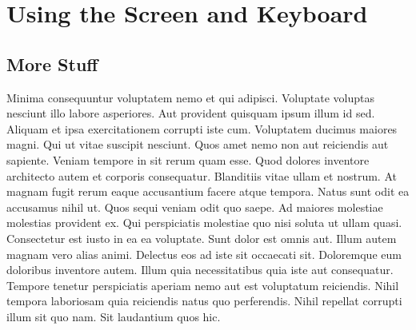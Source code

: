 
\makeatletter\@openrightfalse
\part{Using the Screen and Keyboard}



\chapter{More Stuff}

Minima consequuntur voluptatem nemo et qui adipisci. Voluptate voluptas
nesciunt illo labore asperiores. Aut provident quisquam ipsum illum id sed.
Aliquam et ipsa exercitationem corrupti iste cum. Voluptatem ducimus maiores
magni. Qui ut vitae suscipit nesciunt. Quos amet nemo non aut reiciendis aut
sapiente. Veniam tempore in sit rerum quam esse. Quod dolores inventore
architecto autem et corporis consequatur. Blanditiis vitae ullam et nostrum. At
magnam fugit rerum eaque accusantium facere atque tempora. Natus sunt odit ea
accusamus nihil ut. Quos sequi veniam odit quo saepe. Ad maiores molestiae
molestias provident ex. Qui perspiciatis molestiae quo nisi soluta ut ullam
quasi. Consectetur est iusto in ea ea voluptate. Sunt dolor est omnis aut.
Illum autem magnam vero alias animi. Delectus eos ad iste sit occaecati sit.
Doloremque eum doloribus inventore autem. Illum quia necessitatibus quia iste
aut consequatur. Tempore tenetur perspiciatis aperiam nemo aut est voluptatum
reiciendis. Nihil tempora laboriosam quia reiciendis natus quo perferendis.
Nihil repellat corrupti illum sit quo nam. Sit laudantium quos hic.

\@openrighttrue\makeatother

